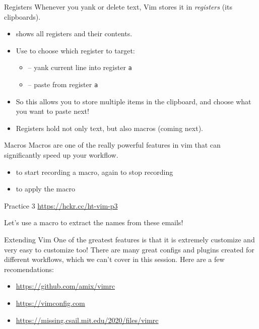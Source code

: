 \documentclass[12pt]{beamer}
\begin{document}
\begin{frame}{Registers}
  Whenever you yank or delete text, Vim stores it in \emph{registers} (its clipboards).

  \begin{itemize}
    \item {} shows all registers and their contents.
    \item Use  to choose which register to target:
      \begin{itemize}
        \item {} -- yank current line into register \texttt{a}
        \item {} -- paste from register \texttt{a}
      \end{itemize}
    \item So this allows you to store multiple items in the clipboard, and choose what you want to paste next!
    \item Registers hold not only text, but also macros (coming next).
  \end{itemize}
\end{frame}


\begin{frame}{Macros}
    Macros are one of the really powerful features in vim that can significantly speed up your workflow.
    \begin{itemize}
        \item {} to start recording a macro,  again to stop recording
        \item {} to apply the macro
    \end{itemize}{}

\end{frame}{}

\begin{frame}{Practice 3}
    \url{https://hckr.cc/ht-vim-p3}

    Let's use a macro to extract the names from these emails!
\end{frame}{}

\begin{frame}{Extending Vim}
    One of the greatest features is that it is extremely customize and very easy to customize too!
    There are many great configs and plugins created for different workflows, which we can't cover in this
    session. Here are a few recomendations:

    \begin{itemize}
        \item \url{https://github.com/amix/vimrc}
        \item \url{https://vimconfig.com}
        \item \url{https://missing.csail.mit.edu/2020/files/vimrc}
    \end{itemize}{}
\end{frame}{}
\end{document}
